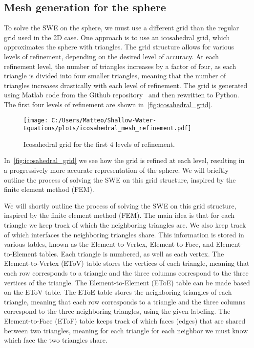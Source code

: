 \subsection*{Mesh generation for the sphere}
To solve the SWE on the sphere, we must use a different grid than the regular grid used in the 2D case.
One approach is to use an icosahedral grid, which approximates the sphere with triangles.
The grid structure allows for various levels of refinement, depending on the desired level of accuracy.
At each refinement level, the number of triangles increases by a factor of four, as each triangle is divided into four smaller triangles, meaning that the number of triangles increases drastically with each level of refinement.
The grid is generated using Matlab code from the Github repository~\cite{sphere_mesh_triangles} and then rewritten to Python.
The first four levels of refinement are shown in~\autoref{fig:icosahedral_grid}.
\begin{figure}[H]
    \centering
    \texttt{[image: C:/Users/Matteo/Shallow-Water-Equations/plots/icosahedral\_mesh\_refinement.pdf]}
    \caption{Icosahedral grid for the first 4 levels of refinement.}\label{fig:icosahedral_grid}
\end{figure}
In~\autoref{fig:icosahedral_grid} we see how the grid is refined at each level, resulting in a progressively more accurate representation of the sphere.
We will brieftly outline the process of solving the SWE on this grid structure, inspired by the finite element method (FEM).


We will shortly outline the process of solving the SWE on this grid structure, inspired by the finite element method (FEM).
The main idea is that for each triangle we keep track of which the neighboring triangles are. 
We also keep track of which interfaces the neighboring triangles share. 
This information is stored in various tables, known as the Element-to-Vertex, Element-to-Face, and Element-to-Element tables.
Each triangle is numbered, as well as each vertex.
The Element-to-Vertex (EToV) table stores the vertices of each triangle, meaning that each row corresponds to a triangle and the three columns correspond to the three vertices of the triangle.
The Element-to-Element (EToE) table can be made based on the EToV table.
The EToE table stores the neighboring triangles of each triangle, meaning that each row corresponds to a triangle and the three columns correspond to the three neighboring triangles, using the given labeling.
The Element-to-Face (EToF) table keeps track of which faces (edges) that are shared between two triangles, meaning for each triangle for each neighbor we must know which face the two triangles share.

